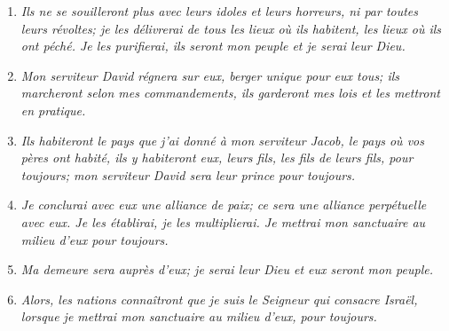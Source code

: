 \begin{enumerate}[leftmargin=\psleftmargin, labelsep = \pslabelsep, label={\arabic*}, font=\color{\pscolor}\small\textsuperscript, parsep=0em, itemsep=0em, topsep=0em ]
{          et ne seront plus divisés en deux royaumes.}
        \newpage
  \item {}\textit{Ils ne se souilleront plus \brk
          avec leurs idoles et leurs horreurs, \brk
          ni par toutes leurs révoltes; \brk
          je les délivrerai \brk
          de tous les lieux où ils habitent, les lieux où ils ont péché. \brk
          Je les purifierai, \brk
          ils seront mon peuple \brk
          et je serai leur Dieu.}
  \item {}\textit{Mon serviteur David régnera sur eux, \brk
          berger unique pour eux tous; \brk
          ils marcheront selon mes commandements, \brk
          ils garderont mes lois et les mettront en pratique.}
  \item {}\textit{Ils habiteront le pays \brk
          que j’ai donné à mon serviteur Jacob, \brk
          le pays où vos pères ont habité, \brk
          ils y habiteront eux, leurs fils, les fils de leurs fils, pour toujours; \brk
          mon serviteur David sera leur prince pour toujours.}
  \item {}\textit{Je conclurai avec eux une alliance de paix; \brk
          ce sera une alliance perpétuelle avec eux. \brk
          Je les établirai, je les multiplierai. \brk
          Je mettrai mon sanctuaire au milieu d’eux pour toujours.}
  \item {}\textit{Ma demeure sera auprès d’eux; \brk
          je serai leur Dieu \brk
          et eux seront mon peuple.}
  \item {}\textit{Alors, les nations connaîtront que je suis le Seigneur qui consacre Israël, \brk
          lorsque je mettrai mon sanctuaire au milieu d’eux, pour toujours.}
\end{enumerate}
